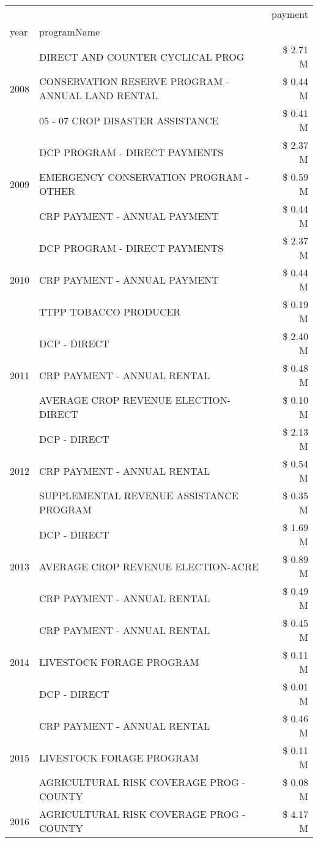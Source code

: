 \begin{tabular}{llr}
\toprule
 &  & payment \\
year & programName &  \\
\midrule
\multirow[t]{3}{*}{2008} & DIRECT AND COUNTER CYCLICAL PROG & \$ 2.71 M \\
 & CONSERVATION RESERVE PROGRAM - ANNUAL LAND RENTAL & \$ 0.44 M \\
 & 05 - 07 CROP DISASTER ASSISTANCE & \$ 0.41 M \\
\cline{1-3}
\multirow[t]{3}{*}{2009} & DCP PROGRAM - DIRECT PAYMENTS & \$ 2.37 M \\
 & EMERGENCY CONSERVATION PROGRAM - OTHER & \$ 0.59 M \\
 & CRP PAYMENT - ANNUAL PAYMENT & \$ 0.44 M \\
\cline{1-3}
\multirow[t]{3}{*}{2010} & DCP PROGRAM - DIRECT PAYMENTS & \$ 2.37 M \\
 & CRP PAYMENT - ANNUAL PAYMENT & \$ 0.44 M \\
 & TTPP TOBACCO PRODUCER & \$ 0.19 M \\
\cline{1-3}
\multirow[t]{3}{*}{2011} & DCP - DIRECT & \$ 2.40 M \\
 & CRP PAYMENT - ANNUAL RENTAL & \$ 0.48 M \\
 & AVERAGE CROP REVENUE ELECTION-DIRECT & \$ 0.10 M \\
\cline{1-3}
\multirow[t]{3}{*}{2012} & DCP - DIRECT & \$ 2.13 M \\
 & CRP PAYMENT - ANNUAL RENTAL & \$ 0.54 M \\
 & SUPPLEMENTAL REVENUE ASSISTANCE PROGRAM & \$ 0.35 M \\
\cline{1-3}
\multirow[t]{3}{*}{2013} & DCP - DIRECT & \$ 1.69 M \\
 & AVERAGE CROP REVENUE ELECTION-ACRE & \$ 0.89 M \\
 & CRP PAYMENT - ANNUAL RENTAL & \$ 0.49 M \\
\cline{1-3}
\multirow[t]{3}{*}{2014} & CRP PAYMENT - ANNUAL RENTAL & \$ 0.45 M \\
 & LIVESTOCK FORAGE PROGRAM & \$ 0.11 M \\
 & DCP - DIRECT & \$ 0.01 M \\
\cline{1-3}
\multirow[t]{3}{*}{2015} & CRP PAYMENT - ANNUAL RENTAL & \$ 0.46 M \\
 & LIVESTOCK FORAGE PROGRAM & \$ 0.11 M \\
 & AGRICULTURAL RISK COVERAGE PROG - COUNTY & \$ 0.08 M \\
\cline{1-3}
\multirow[t]{3}{*}{2016} & AGRICULTURAL RISK COVERAGE PROG - COUNTY & \$ 4.17 M \\

\end{tabular}
